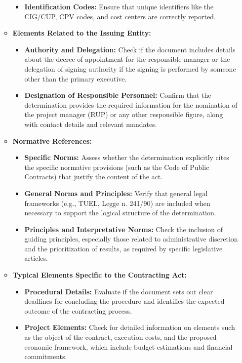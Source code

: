 \documentclass[../main.tex]{subfiles}
\begin{document}
\begin{enumerate}
\begin{itemize}
\begin{itemize}
            \item \textbf{Identification Codes:} Ensure that unique identifiers like the CIG/CUP, CPV codes, and cost centers are correctly reported.
        \end{itemize}
        \item \textbf{Elements Related to the Issuing Entity:}
        \begin{itemize}
            \item \textbf{Authority and Delegation:} Check if the document includes details about the decree of appointment for the responsible manager or the delegation of signing authority if the signing is performed by someone other than the primary executive.
            \item \textbf{Designation of Responsible Personnel:} Confirm that the determination provides the required information for the nomination of the project manager (RUP) or any other responsible figure, along with contact details and relevant mandates.
        \end{itemize}
        \item \textbf{Normative References:}
        \begin{itemize}
            \item \textbf{Specific Norms:} Assess whether the determination explicitly cites the specific normative provisions (such as the Code of Public Contracts) that justify the content of the act.
            \item \textbf{General Norms and Principles:} Verify that general legal frameworks (e.g., TUEL, Legge n. 241/90) are included when necessary to support the logical structure of the determination.
            \item \textbf{Principles and Interpretative Norms:} Check the inclusion of guiding principles, especially those related to administrative discretion and the prioritization of results, as required by specific legislative articles.
        \end{itemize}
        \item \textbf{Typical Elements Specific to the Contracting Act:}
        \begin{itemize}
            \item \textbf{Procedural Details:} Evaluate if the document sets out clear deadlines for concluding the procedure and identifies the expected outcome of the contracting process.
            \item \textbf{Project Elements:} Check for detailed information on elements such as the object of the contract, execution costs, and the proposed economic framework, which include budget estimations and financial commitments.

\end{itemize}
\end{itemize}
\end{enumerate}
\end{document}
